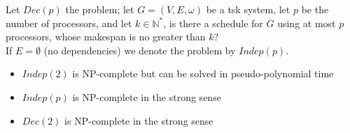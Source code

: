 \begin{defi}
Let $Dec(p)$ the problem; let $G=(V,E,\omega)$ be a tsk system, let $p$ be the number of processors, and let $k\in \mathbb{N}^*$, is there a schedule for $G$ using at most $p$ processors, whose makespan is no greater than $k$?\\
If $E=\emptyset$ (no dependencies) we denote the problem by $Indep(p)$.
\end{defi}  

\begin{thm}
\begin{itemize}
\item $Indep(2)$ is NP-complete but can be solved in pseudo-polynomial time
\item $Indep(p)$ is NP-complete in the strong sense
\item $Dec(2)$ is NP-complete in the strong sense
\end{itemize}
\end{thm}


